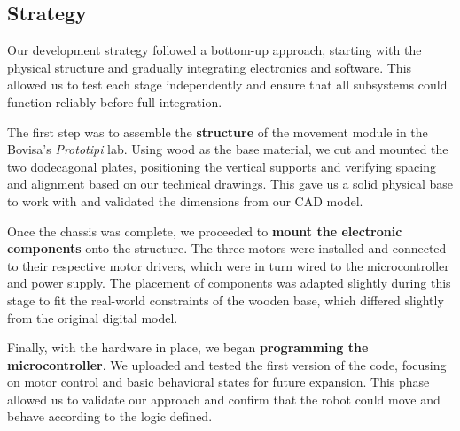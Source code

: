 \subsection{Strategy}

Our development strategy followed a bottom-up approach, starting with the physical structure and gradually integrating electronics and software. This allowed us to test each stage independently and ensure that all subsystems could function reliably before full integration.

The first step was to assemble the \textbf{structure} of the movement module in the Bovisa's \textit{Prototipi} lab. Using wood as the base material, we cut and mounted the two dodecagonal plates, positioning the vertical supports and verifying spacing and alignment based on our technical drawings. This gave us a solid physical base to work with and validated the dimensions from our CAD model.

Once the chassis was complete, we proceeded to \textbf{mount the electronic components} onto the structure. The three motors were installed and connected to their respective motor drivers, which were in turn wired to the microcontroller and power supply. The placement of components was adapted slightly during this stage to fit the real-world constraints of the wooden base, which differed slightly from the original digital model.

Finally, with the hardware in place, we began \textbf{programming the microcontroller}. We uploaded and tested the first version of the code, focusing on motor control and basic behavioral states for future expansion. This phase allowed us to validate our approach and confirm that the robot could move and behave according to the logic defined.
